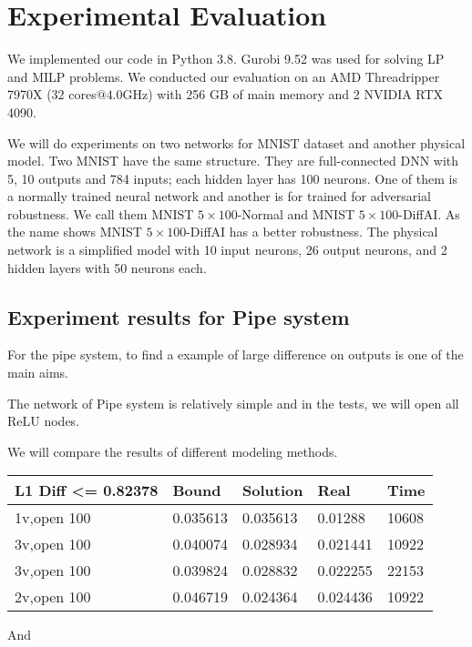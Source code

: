 \documentclass{llncs}
\newcommand{\ReLU}{\mathrm{ReLU}}
\begin{document}
	
	\section{Experimental Evaluation}
	
	We implemented our code in Python 3.8.
	Gurobi 9.52 was used for solving LP and MILP problems. We conducted our evaluation on an AMD Threadripper 7970X  ($32$ cores$@4.0$GHz) with 256 GB of main memory and 2 NVIDIA RTX 4090. 
	
	We will do experiments on two networks for MNIST dataset and another physical model. Two MNIST have the same structure. They are full-connected DNN with 5, 10 outputs and 784 inputs; each hidden layer has 100 neurons. One of them is a normally trained neural network and another is for trained for adversarial robustness. We call them MNIST $5\times100$-Normal and MNIST $5\times 100$-DiffAI. As the name shows MNIST $5\times 100$-DiffAI has a better robustness. The physical network is a simplified model with 10 input neurons, 26 output neurons, and 2 hidden layers with 50 neurons each.
	
	\subsection{Experiment results for Pipe system}
	
	For the pipe system, to find a example of large difference on outputs is one of the main aims.
	
	The network of Pipe system is relatively simple and in the tests, we will open all $\ReLU$ nodes.
	
	We will compare the results of different modeling methods.
	
\begin{tabular}{|l|l|l|l|l|}\hline
L1 Diff <= 0.82378 &        Bound &  Solution &                          Real &  Time \\\hline
	1v,open 100 &     0.035613 &  0.035613 &                       0.01288 & 10608 \\\hline
	3v,open 100 &     0.040074 &  0.028934 &                      0.021441 & 10922 \\\hline
	3v,open 100 &     0.039824 &  0.028832 &                      0.022255 & 22153 \\\hline
	2v,open 100 &     0.046719 &  0.024364 &                      0.024436 & 10922 \\\hline
\end{tabular}
	
	And 
\end{document}
